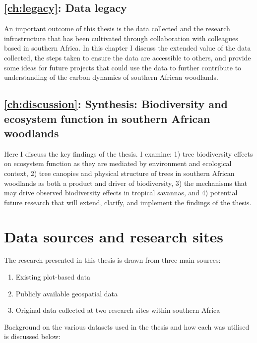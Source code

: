 \begin{refsection}
\subsection{\autoref{ch:legacy}: Data legacy}
\label{intro:ssec:ch:legacy}

An important outcome of this thesis is the data collected and the research infrastructure that has been cultivated through collaboration with colleagues based in southern Africa. In this chapter I discuss the extended value of the data collected, the steps taken to ensure the data are accessible to others, and provide some ideas for future projects that could use the data to further contribute to understanding of the carbon dynamics of southern African woodlands.

\subsection{\autoref{ch:discussion}: Synthesis: Biodiversity and ecosystem function in southern African woodlands}
\label{intro:ssec:ch:discussion}

Here I discuss the key findings of the thesis. I examine: 1) tree biodiversity effects on ecosystem function as they are mediated by environment and ecological context, 2) tree canopies and physical structure of trees in southern African woodlands as both a product and driver of biodiversity, 3) the mechanisms that may drive observed biodiversity effects in tropical savannas, and 4)  potential future research that will extend, clarify, and implement the findings of the thesis.

\section{Data sources and research sites}
\label{intro:sec:sources}

The research presented in this thesis is drawn from three main sources:

\begin{enumerate}
	\item{Existing plot-based data}
	\item{Publicly available geospatial data}
	\item{Original data collected at two research sites within southern Africa}
\end{enumerate}

Background on the various datasets used in the thesis and how each was utilised is discussed below:


\end{refsection}
